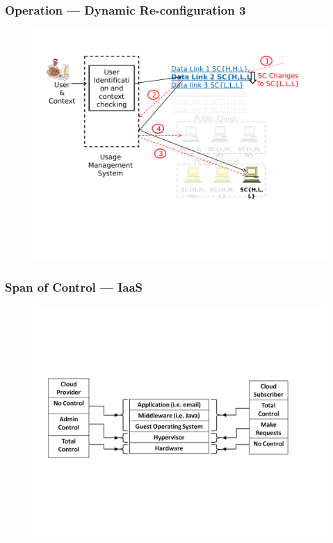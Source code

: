 \documentclass[t,handout]{beamer}
\begin{document}
\begin{frame}
\frametitle{Operation --- Dynamic Re-configuration 3}
\begin{figure}[!t]
\centering
\includegraphics[width=\textwidth]{7}
\end{figure}
\end{frame}

\begin{frame}
\frametitle{Span of Control --- IaaS}
\begin{figure}[!t]
\centering
\includegraphics[width=\textwidth]{8}
\end{figure}
\end{frame}
\end{document}
